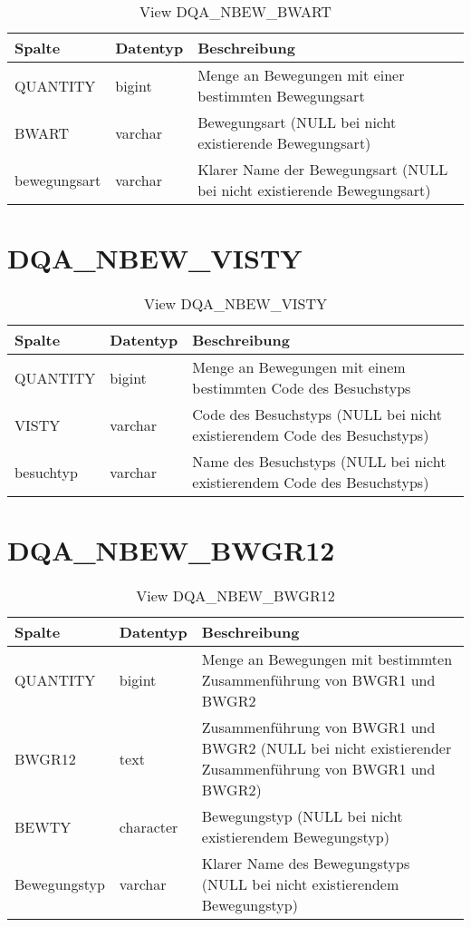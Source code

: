   \begin{table}[ht]
    \centering
    \caption{View DQA\_NBEW\_BWART}
    \label{tab:dqanbewbwart}
    \begin{tabular}{||l|l|p{10cm}||}
      \hline
      Spalte & Datentyp & Beschreibung \\ [0.5ex] \hline \hline
QUANTITY & bigint & Menge an Bewegungen mit einer bestimmten Bewegungsart \\ \hline
BWART & varchar & Bewegungsart (NULL bei nicht existierende Bewegungsart)\\ \hline
bewegungsart & varchar & Klarer Name der Bewegungsart (NULL bei nicht existierende Bewegungsart)\\ \hline
    \end{tabular}
  \end{table}

\section{DQA\_NBEW\_VISTY}

\begin{table}[ht]
	\centering
	\caption{View DQA\_NBEW\_VISTY}
	\label{tab:dqanbewvisty}
	\begin{tabular}{||l|l|p{10cm}||}
		\hline
		Spalte & Datentyp & Beschreibung \\ [0.5ex] \hline \hline
		QUANTITY & bigint & Menge an Bewegungen mit einem bestimmten Code des Besuchstyps \\ \hline
		VISTY & varchar & Code des Besuchstyps (NULL bei nicht existierendem Code des Besuchstyps)\\ \hline
		besuchtyp & varchar & Name des Besuchstyps (NULL bei nicht existierendem Code des Besuchstyps)\\ \hline
	\end{tabular}
\end{table}

 \clearpage
  \section{DQA\_NBEW\_BWGR12}

  \begin{table}[ht]
    \centering
    \caption{View DQA\_NBEW\_BWGR12}
    \label{tab:dqanbewbwgr12}
    \begin{tabular}{||l|l|p{10cm}||}
      \hline
      Spalte & Datentyp & Beschreibung \\ [0.5ex] \hline \hline
QUANTITY & bigint & Menge an Bewegungen mit bestimmten Zusammenführung von BWGR1 und BWGR2 \\ \hline
BWGR12 & text & Zusammenführung von BWGR1 und BWGR2 (NULL bei nicht existierender Zusammenführung von BWGR1 und BWGR2)\\ \hline
BEWTY & character & Bewegungstyp (NULL bei nicht existierendem Bewegungstyp)\\ \hline
Bewegungstyp & varchar & Klarer Name des Bewegungstyps (NULL bei nicht existierendem Bewegungstyp)\\ \hline
    \end{tabular}
  \end{table}

